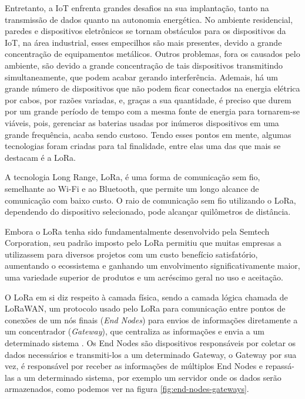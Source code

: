 Entretanto, a IoT enfrenta grandes desafios na sua implantação, tanto na transmissão de dados quanto na autonomia energética. No ambiente residencial, paredes e dispositivos eletrônicos se tornam obstáculos para os dispositivos da IoT, na área industrial, esses empecilhos são mais presentes, devido a grande concentração de equipamentos metálicos. Outros problemas, fora os causados pelo ambiente, são devido a grande concentração de tais dispositivos transmitindo simultaneamente, que podem acabar gerando interferência. Ademais, há um grande número de dispositivos que não podem ficar conectados na energia elétrica por cabos, por razões variadas, e, graças a sua quantidade, é preciso que  durem por um grande período de tempo com a mesma fonte de energia para tornarem-se viáveis, pois, gerenciar as baterias usadas por inúmeros dispositivos em uma grande frequência, acaba sendo custoso. Tendo esses pontos em mente, algumas tecnologias foram criadas para tal finalidade, entre elas uma das que mais se destacam é a LoRa.

A tecnologia Long Range, LoRa, é uma forma de comunicação sem fio, semelhante ao Wi-Fi e ao Bluetooth, que permite um longo alcance de comunicação com baixo custo. O raio de comunicação sem fio utilizando o LoRa, dependendo do dispositivo selecionado, pode alcançar quilômetros de distância.

Embora o LoRa tenha sido fundamentalmente desenvolvido pela Semtech Corporation, seu padrão imposto pelo LoRa permitiu que muitas empresas a utilizassem para diversos projetos com um custo benefício satisfatório, aumentando o ecossistema e ganhando um envolvimento significativamente maior, uma variedade superior de produtos e um acréscimo geral no uso e aceitação. 

O LoRa em si diz respeito à camada física, sendo a camada lógica chamada de LoRaWAN, um protocolo usado pelo LoRa para comunicação entre pontos de conexões de um nós finais (\textit{End Nodes}) para envios de informações diretamente a um concentrador (\textit{Gateway}), que centraliza as informações e envia a um determinado sistema \cite{lora2021specification}. Os End Nodes são dispositivos responsáveis por coletar os dados necessários e transmiti-los a um determinado Gateway, o Gateway por sua vez, é responsável por receber as informações de múltiplos End Nodes e repassá-las a um determinado sistema, por exemplo um servidor onde os dados serão armazenados, como podemos ver na figura \ref{fig:end-nodes-gateways}.

